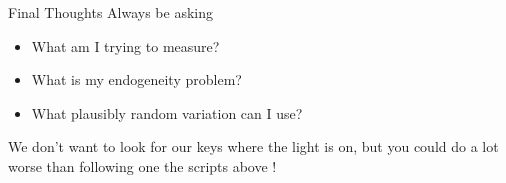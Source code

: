 \begin{frame}{Final Thoughts}
Always be asking
\begin{itemize}
\item What am I trying to measure?
\item What is my endogeneity problem?
\item What plausibly random variation can I use?
\end{itemize}
We don't want to look for our keys where the light is on, but you could do a lot worse than following one the scripts above !
\end{frame}






